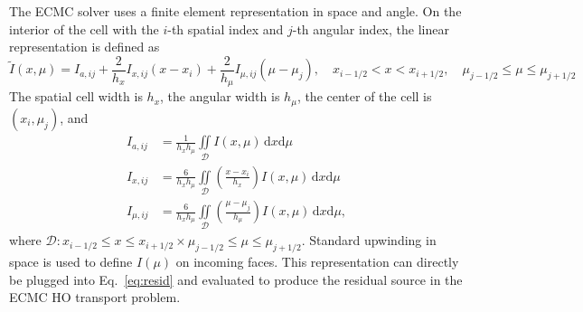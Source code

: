 \documentclass{mc2013}
\renewcommand{\d}{\mathrm{d}}
\newcommand{\il}{{i-1/2}}
\newcommand{\ir}{{i+1/2}}
\newcommand{\jl}{{j-1/2}}
\newcommand{\jr}{{j+1/2}}
\begin{document}
The ECMC solver uses a finite element representation in space and angle. On the
interior of the cell with the $i$-th spatial index and $j$-th angular index, the linear representation is defined as
\begin{equation*}
    \tilde I(x,\mu) = I_{a,ij} + \frac{2}{h_x}I_{x,ij}\left(x-x_i\right) +
    \frac{2}{h_\mu}I_{\mu,ij}\left(\mu-\mu_j\right), \quad x_\il <  x < x_\ir,\quad
     \mu_\jl \leq \mu \leq \mu_\jr
\end{equation*}
The spatial cell width is $h_x$, the angular width is
$h_\mu$, the center of the cell is $(x_i,\mu_j)$, and
\begin{align}\label{app1}
    I_{a,ij} &= \frac{1}{h_x h_\mu} \iint\limits_{\mathcal{D}} I(x,\mu)\, \d x \d \mu \\
    I_{x,ij} &= \frac{6}{h_xh_\mu}\iint\limits_{\mathcal{D}} \left(\frac{x - x_i}{h_{x}}\right)
    I(x,\mu)\, \d x \d \mu \\ \label{app2}
    I_{\mu,ij} &= \frac{6}{h_xh_\mu}\iint\limits_{\mathcal{D}}
     \left(\frac{\mu - \mu_j}{h_{\mu}}\right)
    I(x,\mu)\, \d x \d \mu,
\end{align}
where $\mathcal{D}: x_\il \leq  x \leq  x_\ir \times \mu_\jl \leq \mu \leq \mu_\jr$.
Standard upwinding in space is used to
define $I(\mu)$ on incoming faces. This representation can directly be plugged into
Eq.~\eqref{eq:resid} and evaluated to produce the residual source in the ECMC HO transport
problem. 
\end{document}
